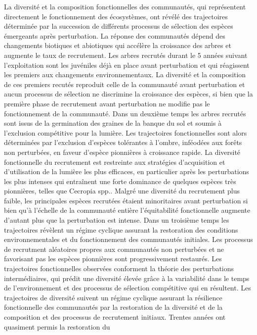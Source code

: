 \documentclass[11pt,french,A4paper,extrafontsizes,onecolumn,openright]{memoir}
\begin{document}
La diversité et la composition fonctionnelles des communautés, qui
représentent directement le fonctionnement des écosystèmes, ont révélé
des trajectoires déterminée par la succession de différents processus de
sélection des espèces émergeants après perturbation. La réponse des
communautés dépend des changements biotiques et abiotiques qui accélère
la croissance des arbres et augmente le taux de recrutement. Les arbres
recrutés durant le 5 années suivant l'exploitation sont les juvéniles
déjà en place avant perturbation et qui réagissent les premiers aux
changements environnementaux. La diversité et la composition de ces
premiers recutés reproduit celle de la communauté avant perturbation et
aucun processus de sélection ne discrimine la croissance des espèces, si
bien que la première phase de recrutement avant perturbation ne modifie
pas le fonctionnement de la communauté. Dans un deuxième temps les
arbres recrutés sont issus de la germination des graines de la banque du
sol et soumis à l'exclusion compétitive pour la lumière. Les
trajectoires fonctionnelles sont alors déterminées par l'exclusion
d'espèces tolérantes à l'ombre, inféodées aux forêts non perturbées, en
faveur d'espèce pionnières à croissance rapide. La diversité
fonctionnelle du recrutement est restreinte aux stratégies d'acquisition
et d'utilisation de la lumière les plus efficaces, en particulier après
les perturbations les plus intenses qui entraînent une forte dominance
de quelques espèces très pionnières, telles que Cecropia spp.. Malgré
une diversité du recrutement plus faible, les principales espèces
recrutées étaient minoritaires avant perturbation si bien qu'à l'échelle
de la communauté entière l'équitabilité fonctionnelle augmente d'autant
plus que la perturbation est intense. Dans un troisième temps les
trajectoires révèlent un régime cyclique assurant la restoration des
conditions environnementales et du fonctionnement des communautés
initiales. Les processus de recrutment aléatoires propres aux
communautés non perturbées et ne favorisant pas les espèces pionnières
sont progressivement restaurés. Les trajectoires fonctionnelles
observées conforment la théorie des perturbations intermédiaires, qui
prédit une diversité élevée grâce à la variabilité dans le temps de
l'environnement et des processus de sélection compétitive qui en
résultent. Les trajectoires de diversité suivent un régime cyclique
assurant la résilience fonctionnelle des communautés par la restoration
de la diversité et de la composition et des processus de recrutement
initiaux. Trentes années ont quasiment permis la restoration du
\end{document}
